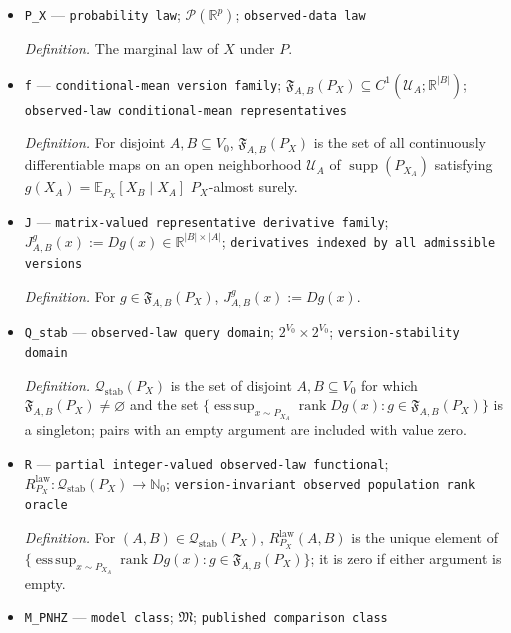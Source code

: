 \documentclass{article}
\begin{document}
\begin{itemize}
  \item \texttt{P\_\allowbreak{}X} --- \texttt{probability law}; \(\mathcal P(\mathbb R^{p})\); \texttt{observed-\allowbreak{}data law}
  \par\smallskip\noindent\emph{Definition.} The marginal law of \(X\) under \(P\).
  \item \texttt{f} --- \texttt{conditional-\allowbreak{}mean version family}; \(\mathfrak F_{A,B}(P_X)\subseteq C^1(\mathcal U_A;\mathbb R^{|B|})\); \texttt{observed-\allowbreak{}law conditional-\allowbreak{}mean representatives}
  \par\smallskip\noindent\emph{Definition.} For disjoint \(A,B\subseteq V_0\), \(\mathfrak F_{A,B}(P_X)\) is the set of all continuously differentiable maps on an open neighborhood \(\mathcal U_A\) of \(\operatorname{supp}(P_{X_A})\) satisfying \(g(X_A)=\mathbb E_{P_X}[X_B\mid X_A]\) \(P_X\)-almost surely.
  \item \texttt{J} --- \texttt{matrix-\allowbreak{}valued representative derivative family}; \(J^g_{A,B}(x):=Dg(x)\in\mathbb R^{|B|\times |A|}\); \texttt{derivatives indexed by all admissible versions}
  \par\smallskip\noindent\emph{Definition.} For \(g\in\mathfrak F_{A,B}(P_X)\), \(J^g_{A,B}(x):=Dg(x)\).
  \item \texttt{Q\_\allowbreak{}stab} --- \texttt{observed-\allowbreak{}law query domain}; \(2^{V_0}\times2^{V_0}\); \texttt{version-\allowbreak{}stability domain}
  \par\smallskip\noindent\emph{Definition.} \(\mathcal Q_{\mathrm{stab}}(P_X)\) is the set of disjoint \(A,B\subseteq V_0\) for which \(\mathfrak F_{A,B}(P_X)\neq\varnothing\) and the set \(\{\operatorname*{ess\,sup}_{x\sim P_{X_A}}\operatorname{rank}Dg(x):g\in\mathfrak F_{A,B}(P_X)\}\) is a singleton; pairs with an empty argument are included with value zero.
  \item \texttt{R} --- \texttt{partial integer-\allowbreak{}valued observed-\allowbreak{}law functional}; \(R^{\mathrm{law}}_{P_X}:\mathcal Q_{\mathrm{stab}}(P_X)\to\mathbb N_0\); \texttt{version-\allowbreak{}invariant observed population rank oracle}
  \par\smallskip\noindent\emph{Definition.} For \((A,B)\in\mathcal Q_{\mathrm{stab}}(P_X)\), \(R^{\mathrm{law}}_{P_X}(A,B)\) is the unique element of \(\{\operatorname*{ess\,sup}_{x\sim P_{X_A}}\operatorname{rank}Dg(x):g\in\mathfrak F_{A,B}(P_X)\}\); it is zero if either argument is empty.
  \item \texttt{M\_\allowbreak{}PNHZ} --- \texttt{model class}; \(\mathfrak M\); \texttt{published comparison class}

\end{itemize}
\end{document}
